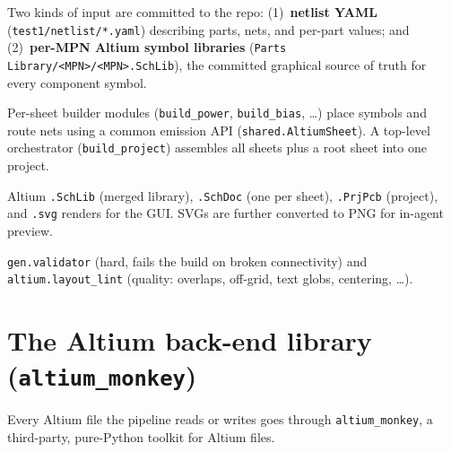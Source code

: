 \documentclass[11pt]{article}
\newcommand{\file}[1]{\texttt{#1}}
\newcommand{\mod}[1]{\texttt{#1}}
\begin{document}
\begin{description}[leftmargin=1.4em]
  \item[Source of truth (inputs).] Two kinds of input are committed to the repo:
    (1)~\textbf{netlist YAML} (\file{test1/netlist/*.yaml}) describing parts, nets,
    and per-part values; and (2)~\textbf{per-MPN Altium symbol libraries}
    (\file{Parts Library/<MPN>/<MPN>.SchLib}), the committed graphical source of
    truth for every component symbol.
  \item[Builders (processing).] Per-sheet builder modules
    (\mod{build\_power}, \mod{build\_bias}, \dots) place symbols and route nets
    using a common emission API (\mod{shared.AltiumSheet}). A top-level
    orchestrator (\mod{build\_project}) assembles all sheets plus a root sheet
    into one project.
  \item[Outputs (artifacts).] Altium \file{.SchLib} (merged library),
    \file{.SchDoc} (one per sheet), \file{.PrjPcb} (project), and \file{.svg}
    renders for the GUI. SVGs are further converted to PNG for in-agent preview.
  \item[Gates.] \mod{gen.validator} (hard, fails the build on broken
    connectivity) and \mod{altium.layout\_lint} (quality: overlaps, off-grid,
    text globs, centering, \dots).
\end{description}

\section{The Altium back-end library (\texttt{altium\_monkey})}

Every Altium file the pipeline reads or writes goes through
\mod{altium\_monkey}, a third-party, pure-Python toolkit for Altium files.
\end{document}
